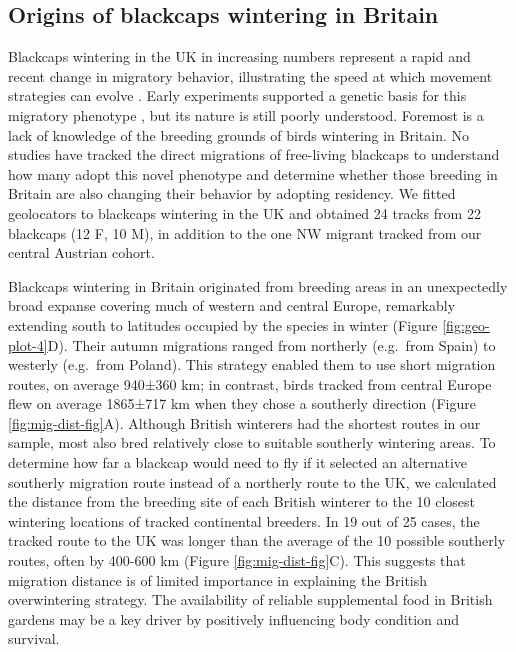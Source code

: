 \documentclass[a4paper, nobind]{templates/ociamthesis}
\begin{document}
\hypertarget{origins-of-blackcaps-wintering-in-britain}{%
\subsection{Origins of blackcaps wintering in Britain}\label{origins-of-blackcaps-wintering-in-britain}}

Blackcaps wintering in the UK in increasing numbers represent a rapid and recent change in migratory behavior, illustrating the speed at which movement strategies can evolve \autocite{bertholdMigratoryBehaviourPopulation1988,leachWinteringBlackcapsBritain1981}.
Early experiments supported a genetic basis for this migratory phenotype \autocite{bertholdRapidMicroevolutionMigratory1992,helbigInheritanceNovelMigratory1994}, but its nature is still poorly understood.
Foremost is a lack of knowledge of the breeding grounds of birds wintering in Britain.
No studies have tracked the direct migrations of free-living blackcaps to understand how many adopt this novel phenotype and determine whether those breeding in Britain are also changing their behavior by adopting residency.
We fitted geolocators to blackcaps wintering in the UK and obtained 24 tracks from 22 blackcaps (12 F, 10 M), in addition to the one NW migrant tracked from our central Austrian cohort.

Blackcaps wintering in Britain originated from breeding areas in an unexpectedly broad expanse covering much of western and central Europe, remarkably extending south to latitudes occupied by the species in winter (Figure \ref{fig:geo-plot-4}D). Their autumn migrations ranged from northerly (e.g.~from Spain) to westerly (e.g.~from Poland).
This strategy enabled them to use short migration routes, on average 940±360 km; in contrast, birds tracked from central Europe flew on average 1865±717 km when they chose a southerly direction (Figure \ref{fig:mig-dist-fig}A).
Although British winterers had the shortest routes in our sample, most also bred relatively close to suitable southerly wintering areas.
To determine how far a blackcap would need to fly if it selected an alternative southerly migration route instead of a northerly route to the UK, we calculated the distance from the breeding site of each British winterer to the 10 closest wintering locations of tracked continental breeders.
In 19 out of 25 cases, the tracked route to the UK was longer than the average of the 10 possible southerly routes, often by 400-600 km (Figure \ref{fig:mig-dist-fig}C).
This suggests that migration distance is of limited importance in explaining the British overwintering strategy. The availability of reliable supplemental food in British gardens may be a key driver \autocite{plummerSupplementaryFeedingGardens2015} by positively influencing body condition and survival.
\end{document}
